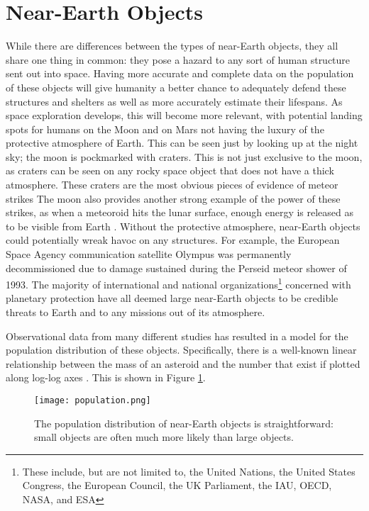 \section{Near-Earth Objects}
While there are differences between the types of near-Earth objects, they all share one thing in common: they pose a hazard to any sort of human structure sent out into space. Having more accurate and complete data on the population of these objects will give humanity a better chance to adequately defend these structures and shelters as well as more accurately estimate their lifespans. As space exploration develops, this will become more relevant, with potential landing spots for humans on the Moon and on Mars not having the luxury of the protective atmosphere of Earth. This can be seen just by looking up at the night sky; the moon is pockmarked with craters. This is not just exclusive to the moon, as craters can be seen on any rocky space object that does not have a thick atmosphere. These craters are the most obvious pieces of evidence of meteor strikes The moon also provides another strong example of the power of these strikes, as when a meteoroid hits the lunar surface, enough energy is released as to be visible from Earth \cite{Rembold2015}. Without the protective atmosphere, near-Earth objects could potentially wreak havoc on any structures. For example, the European Space Agency communication satellite Olympus was permanently decommissioned due to damage sustained during the Perseid meteor shower of 1993. The majority of international and national organizations\footnote{These include, but are not limited to, the United Nations, the United States Congress, the European Council, the UK Parliament, the IAU, OECD, NASA, and ESA\cite{Bottke2007}} concerned with planetary protection have all deemed large near-Earth objects to be credible threats to Earth and to any missions out of its atmosphere\cite{Bottke2007}.

Observational data from many different studies has resulted in a model for the population distribution of these objects. Specifically, there is a well-known linear relationship between the mass of an asteroid and the number that exist if plotted along log-log axes \cite{Rembold2015}. This is shown in Figure \ref{fig:population}.

\begin{figure}[ht!]
  \centering
  \texttt{[image: population.png]}
  \caption{The population distribution of near-Earth objects is straightforward: small objects are often much more likely than large objects. \protect\cite{Rembold2015}}
  \label{fig:population}
\end{figure}

